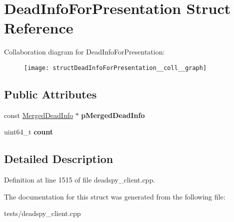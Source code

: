 \hypertarget{structDeadInfoForPresentation}{\section{Dead\-Info\-For\-Presentation Struct Reference}
\label{structDeadInfoForPresentation}
}


Collaboration diagram for Dead\-Info\-For\-Presentation\-:
\nopagebreak
\begin{figure}[H]
\begin{center}
\leavevmode
\texttt{[image: structDeadInfoForPresentation\_\_coll\_\_graph]}
\end{center}
\end{figure}
\subsection*{Public Attributes}
\begin{DoxyCompactItemize}
\item 
\hypertarget{structDeadInfoForPresentation_a78810a52fe1ac7c495d5e81dd915b81d}{const \hyperlink{structMergedDeadInfo}{Merged\-Dead\-Info} $\ast$ {\bfseries p\-Merged\-Dead\-Info}}\label{structDeadInfoForPresentation_a78810a52fe1ac7c495d5e81dd915b81d}

\item 
\hypertarget{structDeadInfoForPresentation_a1e4f6bc81f3cb8c969f4443689af57b8}{uint64\-\_\-t {\bfseries count}}\label{structDeadInfoForPresentation_a1e4f6bc81f3cb8c969f4443689af57b8}

\end{DoxyCompactItemize}


\subsection{Detailed Description}


Definition at line 1515 of file deadspy\-\_\-client.\-cpp.



The documentation for this struct was generated from the following file\-:\begin{DoxyCompactItemize}
\item 
tests/deadspy\-\_\-client.\-cpp\end{DoxyCompactItemize}
